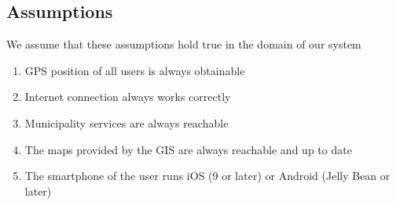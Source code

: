 \subsection{Assumptions}
	We assume that these assumptions hold true in the domain of our system 
	\begin{enumerate}[label=\textbf{	DA\arabic*}]
		\item GPS position of all users is always obtainable
		\item Internet connection always works correctly
		\item Municipality services are always reachable
		\item The maps provided by the GIS are always reachable and up to date
		\item The smartphone of the user runs iOS (9 or later) or Android (Jelly Bean or later)
	\end{enumerate}
		
\clearpage